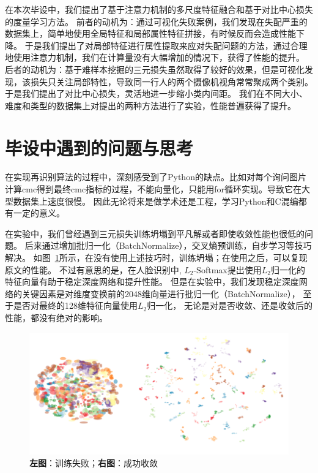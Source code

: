 在本次毕设中，我们提出了基于注意力机制的多尺度特征融合和基于对比中心损失的度量学习方法。
前者的动机为：通过可视化失败案例，我们发现在失配严重的数据集上，简单地使用全局特征和局部属性特征拼接，有时候反而会造成性能下降。
于是我们提出了对局部特征进行属性提取来应对失配问题的方法，通过合理地使用注意力机制，我们在计算量没有大幅增加的情况下，获得了性能的提升。
后者的动机为：基于难样本挖掘的三元损失虽然取得了较好的效果，但是可视化发现，该损失只关注局部特性，导致同一行人的两个摄像机视角常常聚成两个类别。
于是我们提出了对比中心损失，灵活地进一步缩小类内间距。
我们在不同大小、难度和类型的数据集上对提出的两种方法进行了实验，性能普遍获得了提升。

\section{毕设中遇到的问题与思考}

在实现再识别算法的过程中，深刻感受到了Python的缺点。比如对每个询问图片计算cmc得到最终cmc指标的过程，不能向量化，只能用for循环实现。导致它在大型数据集上速度很慢。
因此无论将来是做学术还是工程，学习Python和C混编都有一定的意义。

在实验中，我们曾经遇到三元损失训练坍塌到平凡解或者即使收敛性能也很低的问题。
后来通过增加批归一化（BatchNormalize），交叉熵预训练，自步学习等技巧解决。
如图~\ref{fig:trival}所示，在没有使用上述技巧时，训练坍塌；在使用之后，可以复现原文的性能。
不过有意思的是，在人脸识别中,
$L_2$-Softmax提出使用$L_2$归一化的特征向量有助于稳定深度网络和提升性能。
但是在实验中，我们发现稳定深度网络的关键因素是对维度变换前的2048维向量进行批归一化（BatchNormalize），
至于是否对最终的128维特征向量使用$L_2$归一化，
无论是对是否收敛、还是收敛后的性能，都没有绝对的影响。

\begin{figure}
	\centering
	\includegraphics[width=\textwidth]{fig/2018-05-21-10-49-27.png}
		\caption{\textbf{左图}：训练失败；\textbf{右图}：成功收敛}
		\label{fig:trival}
\end{figure}


